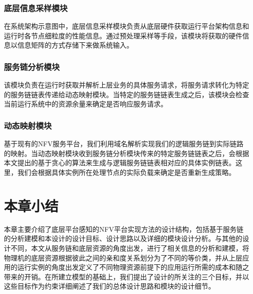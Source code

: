 \subsubsection{底层信息采样模块}
在系统架构示意图中，底层信息采样模块负责从底层硬件获取运行平台架构信息和运行时各节点细粒度的性能信息。通过预处理采样等手段，该模块将获取的硬件信息以信息矩阵的方式存储下来做系统输入。

\subsubsection{服务链分析模块}
该模块负责在运行时获取并解析上层业务的具体服务请求，将服务请求转化为特定的服务链链表传递给动态映射模块。当特定的服务链链表生成之后，该模块会检查当前运行系统中的资源余量来确定是否响应服务请求。

\subsubsection{动态映射模块}
基于现有的NFV服务平台，我们利用域名解析实现我们的逻辑服务链到实际链路的映射。当动态映射模块收到服务链分析模块传来的特定服务链链表之后，会根据本文提出的基于贪心的算法来生成与逻辑服务链链表相对应的具体实例链表。这里，我们会根据具体实例所在处理节点的实际负载来确定是否重新生成策略。

\section{本章小结}
本章主要介绍了底层平台感知的NFV平台实现方法的设计结构，包括基于服务链的分析建模和本设计的设计目标、设计思路以及详细的模块设计分析。与其他的设计不同，本文从服务链和底层资源的角度出发，进行了相关信息的分析和建模，将物理机的底层资源根据彼此之间的亲和度关系划分为了不同的等价类，并从上层应用的运行实例的角度出发定义了不同物理资源前提下的应用运行所需的成本和随之带来的开销。在所建立模型的基础上，我们提出了设计的所关注的三个目标，并以这些目标作为约束详细阐述了我们的总体设计思路和模块的设计细节。